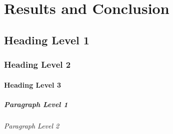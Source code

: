 \cleardoublepage
\chapter{Results and Conclusion}
\label{chap:5}

\section{Heading Level 1}

\subsection{Heading Level 2}

\subsubsection{Heading Level 3}

\paragraph{Paragraph Level 1}

\subparagraph{Paragraph Level 2}
